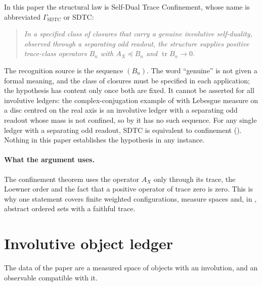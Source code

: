 \documentclass[11pt]{article}
\DeclareMathOperator{\trace}{tr}
\newcommand{\AX}{A_{X}}
\newcommand{\GamSDTC}{\Gamma_{\mathrm{SDTC}}}
\theoremstyle{definition}
\begin{document}
In this paper the structural law is Self-Dual Trace Confinement, whose
name is abbreviated \(\GamSDTC\) or SDTC:
\begin{quote}
  \emph{In a specified class of closures that carry a genuine
  involutive self-duality, observed through a separating odd readout,
  the structure supplies positive trace-class operators \(B_n\) with
  \(\AX\preceq B_n\) and \(\trace B_n\to0\).}
\end{quote}
The recognition source is the sequence \((B_n)\).  The word
``genuine'' is not given a formal meaning, and the class of closures
must be specified in each application; the hypothesis has content
only once both are fixed.  It cannot be asserted for all involutive
ledgers: the complex-conjugation example of 
with Lebesgue measure on a disc centred on the real axis is an
involutive ledger with a
separating odd readout whose mass is not confined, so by
 it has no such
sequence.  For any single ledger with a separating odd readout, SDTC is
equivalent to confinement ().  Nothing in this paper establishes the hypothesis
in any instance.

\paragraph{What the argument uses.}
The confinement theorem uses the operator \(\AX\) only through its
trace, the Loewner order and the fact that a positive operator of
trace zero is zero.  This is why one statement covers finite weighted
configurations, measure spaces and, in
, abstract ordered sets
with a faithful trace.
 \section{Involutive object ledger}
\label{sec:involutive_ledger}

The data of the paper are a measured space of objects with an
involution, and an observable compatible with it.
\end{document}
